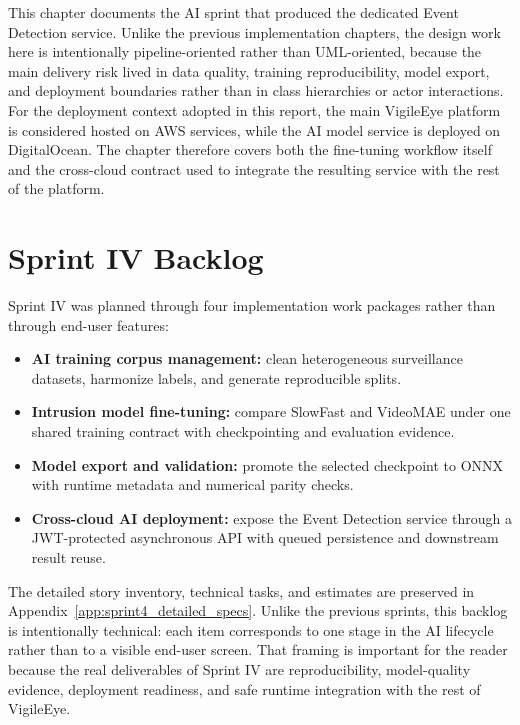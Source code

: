 \documentclass[12pt,a4paper,oneside]{report}
\begin{document}
\hspace{0.8cm}This chapter documents the AI sprint that produced the dedicated Event Detection service. Unlike the previous implementation chapters, the design work here is intentionally pipeline-oriented rather than UML-oriented, because the main delivery risk lived in data quality, training reproducibility, model export, and deployment boundaries rather than in class hierarchies or actor interactions. For the deployment context adopted in this report, the main VigileEye platform is considered hosted on AWS services, while the AI model service is deployed on DigitalOcean. The chapter therefore covers both the fine-tuning workflow itself and the cross-cloud contract used to integrate the resulting service with the rest of the platform.

\section{Sprint IV Backlog}
\label{sec:s4_backlog}

\hspace{0.8cm}Sprint IV was planned through four implementation work packages rather than through end-user features:
\begin{itemize}[leftmargin=1.2cm]
  \item \textbf{AI training corpus management:} clean heterogeneous surveillance datasets, harmonize labels, and generate reproducible splits.
  \item \textbf{Intrusion model fine-tuning:} compare SlowFast and VideoMAE under one shared training contract with checkpointing and evaluation evidence.
  \item \textbf{Model export and validation:} promote the selected checkpoint to ONNX with runtime metadata and numerical parity checks.
  \item \textbf{Cross-cloud AI deployment:} expose the Event Detection service through a JWT-protected asynchronous API with queued persistence and downstream result reuse.
\end{itemize}

\hspace{0.8cm}The detailed story inventory, technical tasks, and estimates are preserved in Appendix~\ref{app:sprint4_detailed_specs}.
\hspace{0.8cm}Unlike the previous sprints, this backlog is intentionally technical: each item corresponds to one stage in the AI lifecycle rather than to a visible end-user screen. That framing is important for the reader because the real deliverables of Sprint IV are reproducibility, model-quality evidence, deployment readiness, and safe runtime integration with the rest of VigileEye.
\end{document}
